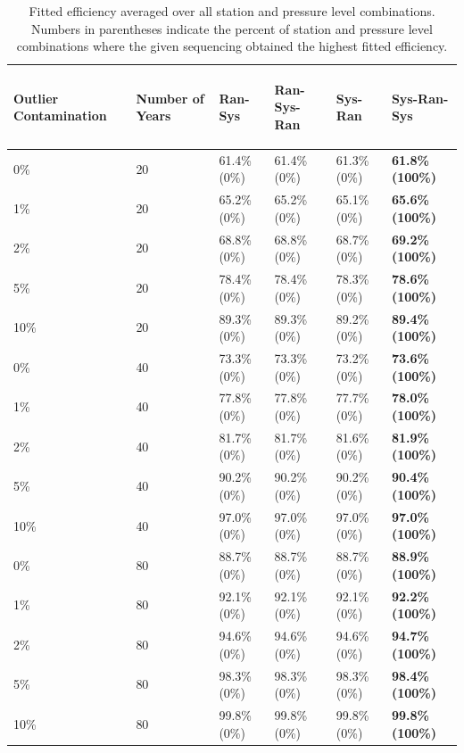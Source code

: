 \documentclass[12pt]{article}
\begin{document}
\begin{table}[ht]
\centering
\begin{tabular}{llllll}
  \hline
\begin{sideways} Outlier Contamination \end{sideways} & \begin{sideways} Number of Years \end{sideways} & \begin{sideways} Ran-Sys \end{sideways} & \begin{sideways} Ran-Sys-Ran \end{sideways} & \begin{sideways} Sys-Ran \end{sideways} & \begin{sideways} Sys-Ran-Sys \end{sideways} \\ 
  \hline
0\% & 20 & 61.4\% (0\%) & 61.4\% (0\%) & 61.3\% (0\%) & \textbf{61.8\% (100\%)} \\ 
  1\% & 20 & 65.2\% (0\%) & 65.2\% (0\%) & 65.1\% (0\%) & \textbf{65.6\% (100\%)} \\ 
  2\% & 20 & 68.8\% (0\%) & 68.8\% (0\%) & 68.7\% (0\%) & \textbf{69.2\% (100\%)} \\ 
  5\% & 20 & 78.4\% (0\%) & 78.4\% (0\%) & 78.3\% (0\%) & \textbf{78.6\% (100\%)} \\ 
  10\% & 20 & 89.3\% (0\%) & 89.3\% (0\%) & 89.2\% (0\%) & \textbf{89.4\% (100\%)} \\ 
  0\% & 40 & 73.3\% (0\%) & 73.3\% (0\%) & 73.2\% (0\%) & \textbf{73.6\% (100\%)} \\ 
  1\% & 40 & 77.8\% (0\%) & 77.8\% (0\%) & 77.7\% (0\%) & \textbf{78.0\% (100\%)} \\ 
  2\% & 40 & 81.7\% (0\%) & 81.7\% (0\%) & 81.6\% (0\%) & \textbf{81.9\% (100\%)} \\ 
  5\% & 40 & 90.2\% (0\%) & 90.2\% (0\%) & 90.2\% (0\%) & \textbf{90.4\% (100\%)} \\ 
  10\% & 40 & 97.0\% (0\%) & 97.0\% (0\%) & 97.0\% (0\%) & \textbf{97.0\% (100\%)} \\ 
  0\% & 80 & 88.7\% (0\%) & 88.7\% (0\%) & 88.7\% (0\%) & \textbf{88.9\% (100\%)} \\ 
  1\% & 80 & 92.1\% (0\%) & 92.1\% (0\%) & 92.1\% (0\%) & \textbf{92.2\% (100\%)} \\ 
  2\% & 80 & 94.6\% (0\%) & 94.6\% (0\%) & 94.6\% (0\%) & \textbf{94.7\% (100\%)} \\ 
  5\% & 80 & 98.3\% (0\%) & 98.3\% (0\%) & 98.3\% (0\%) & \textbf{98.4\% (100\%)} \\ 
  10\% & 80 & 99.8\% (0\%) & 99.8\% (0\%) & 99.8\% (0\%) & \textbf{99.8\% (100\%)} \\ 
   \hline
\end{tabular}
	\caption{Fitted efficiency averaged over all station and pressure level combinations.  Numbers in parentheses indicate the percent of station and pressure level combinations where the given sequencing obtained the highest fitted efficiency.}
	\label{tab:fitEff}
\end{table}
\end{document}
